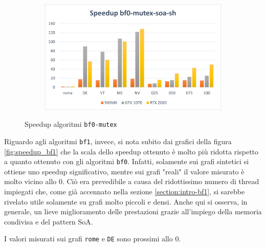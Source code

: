\documentclass[12pt,a4paper,oneside]{book}
\begin{document}
\begin{figure}[b]
\begin{subfigure}{.5\textwidth}
		\end{subfigure}%
		\begin{subfigure}{.5\textwidth}
			\centering
			\includegraphics[width=\textwidth]{speedup_bf0-mutex-soa-sh}
		\end{subfigure}
		\caption{Speedup algoritmi \texttt{bf0-mutex}}
		\label{fig:speedup_bf0-mutex}
	\end{figure}

	Riguardo agli algoritmi \texttt{bf1}, invece, si nota subito dai grafici della figura \ref{fig:speedup_bf1} che la scala dello speedup ottenuto è molto più ridotta rispetto a quanto ottenuto con gli algoritmi \texttt{bf0}. Infatti, solamente sui grafi sintetici si ottiene uno speedup significativo, mentre sui grafi "reali" il valore misurato è molto vicino allo $0$. Ciò era prevedibile a causa del ridottissimo numero di thread impiegati che, come già accennato nella sezione \ref{section:intro-bf1}, si sarebbe rivelato utile solamente su grafi molto piccoli e densi. Anche qui si osserva, in generale, un lieve miglioramento delle prestazioni grazie all'impiego della memoria condivisa e del pattern SoA.
	
	I valori misurati sui grafi \texttt{rome} e \texttt{DE} sono prossimi allo $0$.
\end{document}
